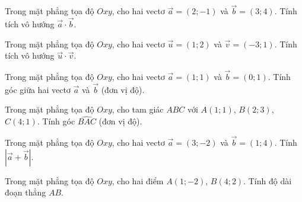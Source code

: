 
\begin{bt}%
Trong mặt phẳng tọa độ $Oxy$, cho hai vectơ $\vec{a}=(2;-1)$ và $\vec{b}=(3;4)$. Tính tích vô hướng $\vec{a}\cdot\vec{b}$.
\end{bt}

\begin{bt}%
Trong mặt phẳng tọa độ $Oxy$, cho hai vectơ $\vec{u}=(1;2)$ và $\vec{v}=(-3;1)$. Tính tích vô hướng $\vec{u}\cdot\vec{v}$.
\end{bt}

\begin{bt}%
Trong mặt phẳng tọa độ $Oxy$, cho hai vectơ $\vec{a}=(1;1)$ và $\vec{b}=(0;1)$. Tính góc giữa hai vectơ $\vec{a}$ và $\vec{b}$ (đơn vị độ).
\end{bt}

\begin{bt}%
Trong mặt phẳng tọa độ $Oxy$, cho tam giác $ABC$ với $A(1;1)$, $B(2;3)$, $C(4;1)$. Tính góc $\widehat{BAC}$ (đơn vị độ).
\end{bt}

\begin{bt}%
Trong mặt phẳng tọa độ $Oxy$, cho hai vectơ $\vec{a}=(3;-2)$ và $\vec{b}=(1;4)$. Tính $|\vec{a}+\vec{b}|$.
\end{bt}

\begin{bt}%
Trong mặt phẳng tọa độ $Oxy$, cho hai điểm $A(1;-2)$, $B(4;2)$. Tính độ dài đoạn thẳng $AB$.
\end{bt}

